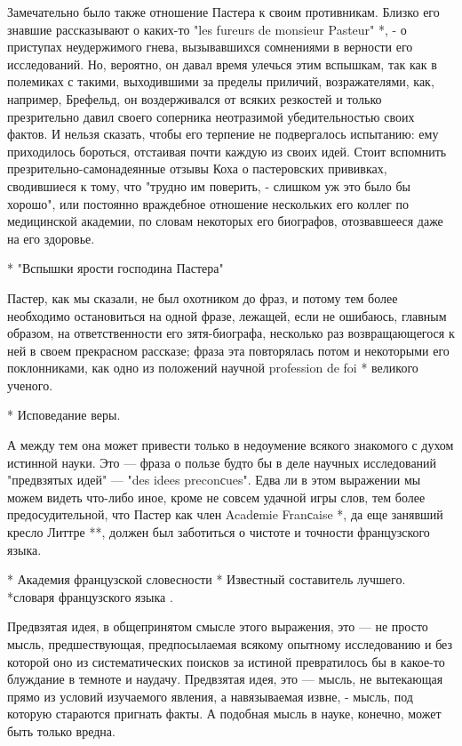 Замечательно было также отношение  Пастера к своим противникам. Близко
его знавшие рассказывают о каких-то  "les fureurs de monsieur Pasteur"
*,  -  о  приступах  неудержимого  гнева,  вызывавшихся  сомнениями  в
верности его исследований.  Но, вероятно, он давал  время улечься этим
вспышкам,  так  как  в  полемиках с  такими,  выходившими  за  пределы
приличий,  возражателями, как,  например,  Брефельд, он  воздерживался
от  всяких  резкостей и  только  презрительно  давил своего  соперника
неотразимой   убедительностью   своих   фактов.  И   нельзя   сказать,
чтобы  его   терпение  не  подвергалось  испытанию:   ему  приходилось
бороться,  отстаивая  почти  каждую  из своих  идей.  Стоит  вспомнить
презрительно-самонадеянные  отзывы  Коха   о  пастеровских  прививках,
сводившиеся к тому, что "трудно им  поверить, - слишком уж это было бы
хорошо", или  постоянно враждебное отношение нескольких  его коллег по
медицинской академии, по словам  некоторых его биографов, отозвавшееся
даже на его здоровье.

* "Вспышки ярости господина Пастера"

Пастер, как мы  сказали, не был охотником до фраз,  и потому тем более
необходимо  остановиться на  одной фразе,  лежащей, если  не ошибаюсь,
главным  образом,  на  ответственности  его  зятя-биографа,  несколько
раз  возвращающегося к  ней  в своем  прекрасном  рассказе; фраза  эта
повторялась потом и некоторыми его поклонниками, как одно из положений
научной profession de foi * великого ученого.

* Исповедание веры.

А между тем она может привести только в недоумение всякого знакомого с
духом истинной науки.  Это --- фраза о пользе будто  бы в деле научных
исследований "предвзятых идей"  --- "des idees preconсues".  Едва ли в
этом выражении мы можем видеть  что-либо иное, кроме не совсем удачной
игры слов,  тем более предосудительной,  что Пастер как  член Acadеmie
Franсaise *, да еще занявший кресло Литтре **, должен был заботиться о
чистоте и точности французского языка.

* Академия  французской словесности  * Известный  составитель лучшего.
*словаря французского языка                                          .

Предвзятая  идея,  в  общепринятом  смысле этого  выражения,  это  ---
не  просто  мысль,  предшествующая,  предпосылаемая  всякому  опытному
исследованию и без  которой оно из систематических  поисков за истиной
превратилось бы в  какое-то блуждание в темноте  и наудачу. Предвзятая
идея,  это  ---  мысль,  не вытекающая  прямо  из  условий  изучаемого
явления, а навязываемая извне, - мысль, под которую стараются пригнать
факты. А подобная мысль в науке, конечно, может быть только вредна.

